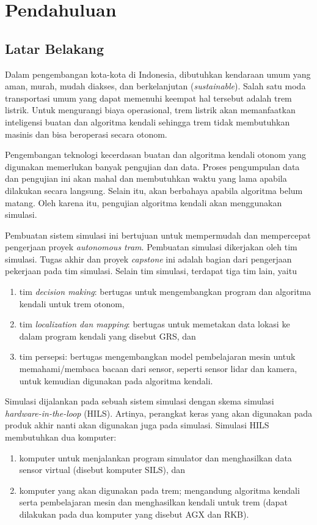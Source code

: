 \chapter{Pendahuluan}

\section{Latar Belakang}

Dalam pengembangan kota-kota di Indonesia, dibutuhkan kendaraan umum yang aman,
murah, mudah diakses, dan berkelanjutan (\textit{sustainable}). Salah satu moda
transportasi umum yang dapat memenuhi keempat hal tersebut adalah trem listrik.
Untuk mengurangi biaya operasional, trem listrik akan memanfaatkan inteligensi
buatan dan algoritma kendali sehingga trem tidak membutuhkan masinis dan bisa
beroperasi secara otonom.

Pengembangan teknologi kecerdasan buatan dan algoritma kendali otonom yang
digunakan memerlukan banyak pengujian dan data. Proses pengumpulan data dan
pengujian ini akan mahal dan membutuhkan waktu yang lama apabila dilakukan
secara langsung. Selain itu, akan berbahaya apabila algoritma belum matang. Oleh
karena itu, pengujian algoritma kendali akan menggunakan simulasi.

Pembuatan sistem simulasi ini bertujuan untuk mempermudah dan mempercepat
pengerjaan proyek \textit{autonomous tram}. Pembuatan simulasi dikerjakan oleh
tim simulasi. Tugas akhir dan proyek \textit{capstone} ini adalah bagian dari
pengerjaan pekerjaan pada tim simulasi. Selain tim simulasi, terdapat tiga tim
lain, yaitu
\begin{enumerate}
	\item tim \textit{decision making}: bertugas untuk mengembangkan program dan
		algoritma kendali untuk trem otonom,
	\item tim \textit{localization dan mapping}: bertugas untuk memetakan data
		lokasi ke dalam program kendali yang disebut GRS, dan
	\item tim persepsi: bertugas mengembangkan model pembelajaran mesin untuk
		memahami/membaca bacaan dari sensor, seperti sensor lidar dan kamera,
		untuk kemudian digunakan pada algoritma kendali.
\end{enumerate}

Simulasi dijalankan pada sebuah sistem simulasi dengan skema simulasi
\textit{hardware-in-the-loop} (HILS). Artinya, perangkat keras yang akan
digunakan pada produk akhir nanti akan digunakan juga pada simulasi. Simulasi
HILS membutuhkan dua komputer:
\begin{enumerate}
	\item komputer untuk menjalankan program simulator dan menghasilkan data
		sensor virtual (disebut komputer SILS), dan
	\item komputer yang akan digunakan pada trem; mengandung algoritma
		kendali serta pembelajaran mesin dan menghasilkan kendali untuk trem
		(dapat dilakukan pada dua komputer yang disebut AGX dan RKB).
\end{enumerate}


